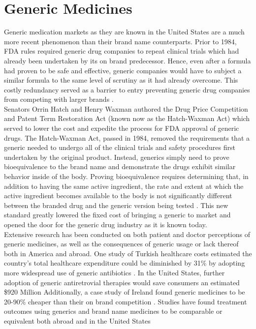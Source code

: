 \section{Generic Medicines}
Generic medication markets as they are known in the United States are a much more recent phenomenon than their brand name counterparts. Prior to 1984, FDA rules required generic drug companies to repeat clinical trials which had already been undertaken by its on brand predecessor. Hence, even after a formula had proven to be safe and effective, generic companies would have to subject a similar formula to the same level of scrutiny as it had already overcome. This costly redundancy served as a barrier to entry preventing generic drug companies from competing with larger brands \cite{eban_bottle_2019}.\\
\indent Senators Orrin Hatch and Henry Waxman authored the Drug Price Competition and Patent Term Restoration Act (known now as the Hatch-Waxman Act) which served to lower the cost and expedite the process for FDA approval of generic drugs. The Hatch-Waxman Act, passed in 1984, removed the requirements that a generic needed to undergo all of the clinical trials and safety procedures first undertaken by the original product. Instead, generics simply need to prove bioequivalence to the brand name and demonstrate the drugs exhibit similar behavior inside of the body. Proving bioequivalence requires determining that, in addition to having the same active ingredient, the rate and extent at which the active ingredient becomes available to the body is not significantly different between the branded drug and the generic version being tested \cite{fda_primer}. This new standard greatly lowered the fixed cost of bringing a generic to market and opened the door for the generic drug industry as it is known today.\\
\indent Extensive research has been conducted on both patient and doctor perceptions of generic medicines, as well as the consequences of generic usage or lack thereof both in America and abroad. One study of Turkish healthcare costs estimated the country's total healthcare expenditure could be diminished by 31\% by adopting more widespread use of generic antibiotics \cite{mercanoglu_evaluation_2018}. In the United States, further adoption of generic antiretrovial therapies would save consumers an estimated \$920 Million \cite{walensky_economic_2013} Additionally, a case study of Ireland found generic medicines to be 20-90\% cheaper than their on brand competition \cite{dunne_review_2013}. Studies have found treatment outcomes using generics and brand name medicines to be comparable or equivalent both abroad \cite{lin_comparative_2017} and in the United States \cite{desai_comparative_2019}\\
